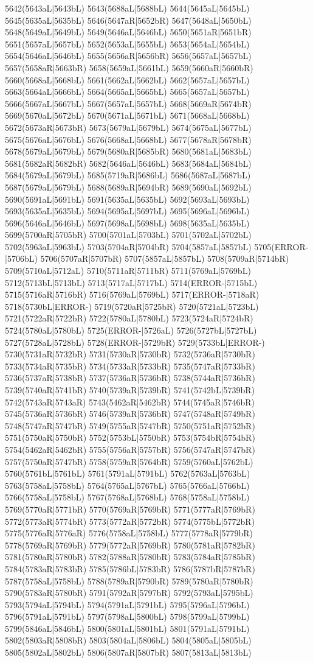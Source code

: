 5642(5643aL|5643bL) 5643(5688aL|5688bL) 5644(5645aL|5645bL) 5645(5635aL|5635bL) 5646(5647aR|5652bR) 5647(5648aL|5650bL) 5648(5649aL|5649bL) 5649(5646aL|5646bL) 5650(5651aR|5651bR) 5651(5657aL|5657bL) 5652(5653aL|5655bL) 5653(5654aL|5654bL) 5654(5646aL|5646bL) 5655(5656aR|5656bR) 5656(5657aL|5657bL) 5657(5658aR|5663bR) 5658(5659aL|5661bL) 5659(5660aR|5660bR) 5660(5668aL|5668bL) 5661(5662aL|5662bL) 5662(5657aL|5657bL) 5663(5664aL|5666bL) 5664(5665aL|5665bL) 5665(5657aL|5657bL) 5666(5667aL|5667bL) 5667(5657aL|5657bL) 5668(5669aR|5674bR) 5669(5670aL|5672bL) 5670(5671aL|5671bL) 5671(5668aL|5668bL) 5672(5673aR|5673bR) 5673(5679aL|5679bL) 5674(5675aL|5677bL) 5675(5676aL|5676bL) 5676(5668aL|5668bL) 5677(5678aR|5678bR) 5678(5679aL|5679bL) 5679(5680aR|5685bR) 5680(5681aL|5683bL) 5681(5682aR|5682bR) 5682(5646aL|5646bL) 5683(5684aL|5684bL) 5684(5679aL|5679bL) 5685(5719aR|5686bL) 5686(5687aL|5687bL) 5687(5679aL|5679bL) 5688(5689aR|5694bR) 5689(5690aL|5692bL) 5690(5691aL|5691bL) 5691(5635aL|5635bL) 5692(5693aL|5693bL) 5693(5635aL|5635bL) 5694(5695aL|5697bL) 5695(5696aL|5696bL) 5696(5646aL|5646bL) 5697(5698aL|5698bL) 5698(5635aL|5635bL) 5699(5700aR|5705bR) 5700(5701aL|5703bL) 5701(5702aL|5702bL) 5702(5963aL|5963bL) 5703(5704aR|5704bR) 5704(5857aL|5857bL) 5705(ERROR-|5706bL) 5706(5707aR|5707bR) 5707(5857aL|5857bL) 5708(5709aR|5714bR) 5709(5710aL|5712aL) 5710(5711aR|5711bR) 5711(5769aL|5769bL) 5712(5713bL|5713bL) 5713(5717aL|5717bL) 5714(ERROR-|5715bL) 5715(5716aR|5716bR) 5716(5769aL|5769bL) 5717(ERROR-|5718aR) 5718(5730bL|ERROR-) 5719(5720aR|5725bR) 5720(5721aL|5723bL) 5721(5722aR|5722bR) 5722(5780aL|5780bL) 5723(5724aR|5724bR) 5724(5780aL|5780bL) 5725(ERROR-|5726aL) 5726(5727bL|5727bL) 5727(5728aL|5728bL) 5728(ERROR-|5729bR) 5729(5733bL|ERROR-) 5730(5731aR|5732bR) 5731(5730aR|5730bR) 5732(5736aR|5730bR) 5733(5734aR|5735bR) 5734(5733aR|5733bR) 5735(5747aR|5733bR) 5736(5737aR|5738bR) 5737(5736aR|5736bR) 5738(5744aR|5736bR) 5739(5740aR|5741bR) 5740(5739aR|5739bR) 5741(5742bL|5739bR) 5742(5743aR|5743aR) 5743(5462aR|5462bR) 5744(5745aR|5746bR) 5745(5736aR|5736bR) 5746(5739aR|5736bR) 5747(5748aR|5749bR) 5748(5747aR|5747bR) 5749(5755aR|5747bR) 5750(5751aR|5752bR) 5751(5750aR|5750bR) 5752(5753bL|5750bR) 5753(5754bR|5754bR) 5754(5462aR|5462bR) 5755(5756aR|5757bR) 5756(5747aR|5747bR) 5757(5750aR|5747bR) 5758(5759aR|5764bR) 5759(5760aL|5762bL) 5760(5761bL|5761bL) 5761(5791aL|5791bL) 5762(5763aL|5763bL) 5763(5758aL|5758bL) 5764(5765aL|5767bL) 5765(5766aL|5766bL) 5766(5758aL|5758bL) 5767(5768aL|5768bL) 5768(5758aL|5758bL) 5769(5770aR|5771bR) 5770(5769aR|5769bR) 5771(5777aR|5769bR) 5772(5773aR|5774bR) 5773(5772aR|5772bR) 5774(5775bL|5772bR) 5775(5776aR|5776aR) 5776(5758aL|5758bL) 5777(5778aR|5779bR) 5778(5769aR|5769bR) 5779(5772aR|5769bR) 5780(5781aR|5782bR) 5781(5780aR|5780bR) 5782(5788aR|5780bR) 5783(5784aR|5785bR) 5784(5783aR|5783bR) 5785(5786bL|5783bR) 5786(5787bR|5787bR) 5787(5758aL|5758bL) 5788(5789aR|5790bR) 5789(5780aR|5780bR) 5790(5783aR|5780bR) 5791(5792aR|5797bR) 5792(5793aL|5795bL) 5793(5794aL|5794bL) 5794(5791aL|5791bL) 5795(5796aL|5796bL) 5796(5791aL|5791bL) 5797(5798aL|5800bL) 5798(5799aL|5799bL) 5799(5846aL|5846bL) 5800(5801aL|5801bL) 5801(5791aL|5791bL) 5802(5803aR|5808bR) 5803(5804aL|5806bL) 5804(5805aL|5805bL) 5805(5802aL|5802bL) 5806(5807aR|5807bR) 5807(5813aL|5813bL) 